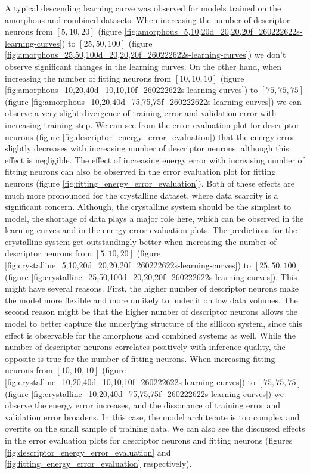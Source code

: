 A typical descending learning curve was observed for models trained on the
amorphous and combined datasets. When increasing the number of descriptor
neurons from $[5, 10, 20]$ (figure
\ref{fig:amorphous_5,10,20d_20,20,20f_260222622s-learning-curves}) to
$[25, 50, 100]$ (figure
\ref{fig:amorphous_25,50,100d_20,20,20f_260222622s-learning-curves}) we don't
observe significant changes in the learning curves. On the other hand, when
increasing the number of fitting neurons from $[10, 10, 10]$
(figure \ref{fig:amorphous_10,20,40d_10,10,10f_260222622s-learning-curves}) to
$[75, 75, 75]$ (figure
\ref{fig:amorphous_10,20,40d_75,75,75f_260222622s-learning-curves}) we can
observe a very slight divergence of training error and validation error with
increasing training step. We can see from the error evaluation plot for
descriptor neurons (figure \ref{fig:descriptor_energy_error_evaluation}) that
the energy error slightly decreases with increasing number of descriptor
neurons, although this effect is negligible. The effect of increasing energy
error with increasing number of fitting neurons can also be observed in the
error evaluation plot for fitting neurons (figure
\ref{fig:fitting_energy_error_evaluation}). Both of these effects are much
more pronounced for the crystalline dataset, where data scarcity is a
significant concern. Although, the crystalline system should be the simplest
to model, the shortage of data plays a major role here, which can be observed
in the learning curves and in the energy error evaluation plots.
The predictions for the crystalline system get outstandingly better when
increasing the number of descriptor neurons from $[5, 10, 20]$ (figure
\ref{fig:crystalline_5,10,20d_20,20,20f_260222622s-learning-curves}) to
$[25, 50, 100]$ (figure
\ref{fig:crystalline_25,50,100d_20,20,20f_260222622s-learning-curves}). This
might have several reasons. First, the higher number of descriptor neurons
make the model more flexible and more unlikely to underfit on low data
volumes. The second reason might be that the higher number of descriptor
neurons allows the model to better capture the underlying structure of the
sillicon system, since this effect is observable for the amorphous and
combined systems as well. While the number of descriptor neurons correlates
positively with inference quality, the opposite is true for the number of
fitting neurons. When increasing fitting neurons from $[10, 10, 10]$
(figure \ref{fig:crystalline_10,20,40d_10,10,10f_260222622s-learning-curves})
to $[75, 75, 75]$
(figure \ref{fig:crystalline_10,20,40d_75,75,75f_260222622s-learning-curves})
we observe the energy error increases, and the dissonance of training error
and validation error broadens. In this case, the model architecute is too
complex and overfits on the small sample of training data. We can also see
the discussed effects in the error evaluation plots for descriptor neurons
and fitting neurons (figures \ref{fig:descriptor_energy_error_evaluation} and
\ref{fig:fitting_energy_error_evaluation} respectively).

